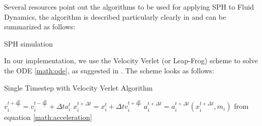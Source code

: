 \documentclass{sigchi}
\begin{document}
Several resources point out the algorithms to be used for applying SPH to Fluid Dynamics, the algorithm is described particularly clearly in \cite{kennyerleben} and can be summarized as follows:
%
\FloatBarrier
\begin{algorithm}
	\caption{SPH simulation}
\end{algorithm}
\FloatBarrier
%
In our implementation, we use the Velocity Verlet (or Leap-Frog) scheme to solve the ODE \ref{math:ode}, as suggested in \cite{generalizedwallboundary}.
The scheme looks as follows:
%
\begin{algorithm}
	\caption{Single Timestep with Velocity Verlet Algorithm}
	$v_i^{t+\frac{\Delta t}{2}} = v_i^{t - \frac{\Delta t}{2}} + \Delta t a_i^t$ \;
	$x_i^{t+\Delta t} = x_i^t + \Delta t v_i^{t+\frac{\Delta t}{2}}$ \;	
	$a_i^{t + \Delta t} = a_i^{t + \Delta t} (x_i^{t + \Delta t}, m_i)$ from equation \ref{math:acceleration} \;
\end{algorithm}


\clearpage
\end{document}
